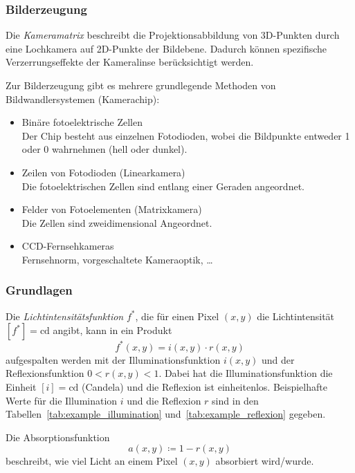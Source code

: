 \documentclass[a4paper, 11pt, accentcolor = tud3b]{tudreport}
\begin{document}
				\subsubsection{Bilderzeugung}
					Die \emph{Kameramatrix} beschreibt die Projektionsabbildung von 3D-Punkten durch eine Lochkamera auf 2D-Punkte der Bildebene. Dadurch können spezifische Verzerrungseffekte der Kameralinse berücksichtigt werden.
					
					Zur Bilderzeugung gibt es mehrere grundlegende Methoden von Bildwandlersystemen (Kamerachip):
					\begin{itemize}
						\item Binäre fotoelektrische Zellen \\ Der Chip besteht aus einzelnen Fotodioden, wobei die Bildpunkte entweder \num{1} oder \num{0} wahrnehmen (hell oder dunkel).
						\item Zeilen von Fotodioden (Linearkamera) \\ Die fotoelektrischen Zellen sind entlang einer Geraden angeordnet.
						\item Felder von Fotoelementen (Matrixkamera) \\ Die Zellen sind zweidimensional Angeordnet.
						\item CCD-Fernsehkameras \\ Fernsehnorm, vorgeschaltete Kameraoptik, \dots
					\end{itemize}

				\subsubsection{Grundlagen}
					Die \emph{Lichtintensitätsfunktion} \( f^\ast \), die für einen Pixel \( (x, y) \) die Lichtintensität \( [f^\ast] = \si{\candela} \) angibt, kann in ein Produkt
					\begin{equation*}
						f^\ast(x, y) = i(x, y) \cdot r(x, y)
					\end{equation*}
					aufgespalten werden mit der Illuminationsfunktion \( i(x, y) \) und der Reflexionsfunktion \( 0 < r(x, y) < 1 \). Dabei hat die Illuminationsfunktion die Einheit \( [i] = \si{\candela} \) (Candela) und die Reflexion ist einheitenlos. Beispielhafte Werte für die Illumination \(i\) und die Reflexion \(r\) sind in den Tabellen~\ref{tab:example_illumination} und~\ref{tab:example_reflexion} gegeben.
					
					Die Absorptionsfunktion
					\begin{equation*}
						a(x, y) \coloneqq 1 - r(x, y)
					\end{equation*}
					beschreibt, wie viel Licht an einem Pixel \( (x, y) \) absorbiert wird/wurde.
					
\end{document}
